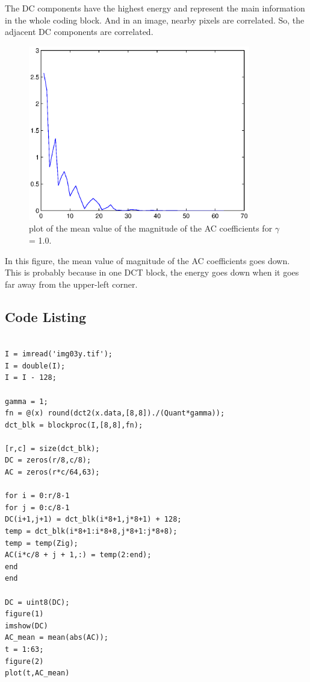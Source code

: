\documentclass[paper=a4, fontsize=11pt]{scrartcl} %
\numberwithin{equation}{section} %
\numberwithin{figure}{section} %
\numberwithin{table}{section} %
\begin{document}
The DC components have the highest energy and represent the main information in the whole coding block. And in an image, nearby pixels are correlated. So, the adjacent DC components are correlated.
\begin{figure}[H]
	
	\centering
	\includegraphics[height = 3in]{plot.eps}
	\caption{ plot of the mean value of the magnitude of the AC coefficients for $\gamma$ = 1.0.}
	
	
	
\end{figure}

In this figure, the mean value of magnitude of the AC coefficients goes down. This is probably because in one DCT block, the energy goes down when it goes far away from the upper-left corner. 
\subsection{Code Listing}
\begin{lstlisting}[frame=single]

I = imread('img03y.tif');
I = double(I);
I = I - 128;

gamma = 1;
fn = @(x) round(dct2(x.data,[8,8])./(Quant*gamma));
dct_blk = blockproc(I,[8,8],fn);

[r,c] = size(dct_blk);
DC = zeros(r/8,c/8);
AC = zeros(r*c/64,63);

for i = 0:r/8-1
for j = 0:c/8-1
DC(i+1,j+1) = dct_blk(i*8+1,j*8+1) + 128;
temp = dct_blk(i*8+1:i*8+8,j*8+1:j*8+8);
temp = temp(Zig);
AC(i*c/8 + j + 1,:) = temp(2:end);
end
end

DC = uint8(DC);
figure(1)
imshow(DC)
AC_mean = mean(abs(AC));
t = 1:63;
figure(2)
plot(t,AC_mean)


\end{lstlisting}
\end{document}

